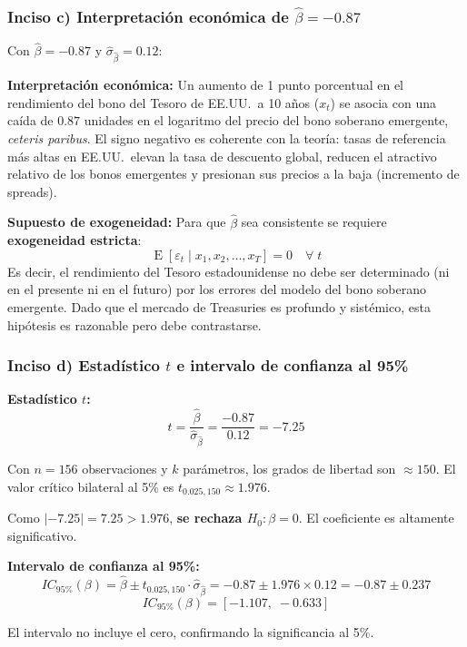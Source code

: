 \documentclass[12pt,a4paper]{article}
\DeclareMathOperator{\E}{E}
\begin{document}
\subsubsection*{Inciso c) Interpretación económica de $\hat{\beta}=-0.87$}

\begin{solucion}
Con $\hat{\beta}=-0.87$ y $\hat{\sigma}_{\hat{\beta}}=0.12$:

\textbf{Interpretación económica:} Un aumento de 1 punto porcentual en el rendimiento del bono del Tesoro de EE.UU.\ a 10 años ($x_t$) se asocia con una caída de $0.87$ unidades en el logaritmo del precio del bono soberano emergente, \emph{ceteris paribus}. El signo negativo es coherente con la teoría: tasas de referencia más altas en EE.UU.\ elevan la tasa de descuento global, reducen el atractivo relativo de los bonos emergentes y presionan sus precios a la baja (incremento de spreads).

\textbf{Supuesto de exogeneidad:} Para que $\hat{\beta}$ sea consistente se requiere \textbf{exogeneidad estricta}:
\begin{equation}
\E[\varepsilon_t \mid x_1, x_2, \ldots, x_T] = 0 \quad \forall\; t
\end{equation}
Es decir, el rendimiento del Tesoro estadounidense no debe ser determinado (ni en el presente ni en el futuro) por los errores del modelo del bono soberano emergente. Dado que el mercado de Treasuries es profundo y sistémico, esta hipótesis es razonable pero debe contrastarse.
\end{solucion}

\subsubsection*{Inciso d) Estadístico $t$ e intervalo de confianza al 95\%}

\begin{solucion}
\textbf{Estadístico $t$:}
\begin{equation}
t = \frac{\hat{\beta}}{\hat{\sigma}_{\hat{\beta}}} = \frac{-0.87}{0.12} = -7.25
\end{equation}

Con $n=156$ observaciones y $k$ parámetros, los grados de libertad son $\approx 150$. El valor crítico bilateral al 5\% es $t_{0.025,150}\approx 1.976$.

Como $|{-7.25}| = 7.25 > 1.976$, \textbf{se rechaza $H_0:\beta=0$}. El coeficiente es altamente significativo.

\textbf{Intervalo de confianza al 95\%:}
\begin{equation}
IC_{95\%}(\beta) = \hat{\beta} \pm t_{0.025,150}\cdot\hat{\sigma}_{\hat{\beta}} = -0.87 \pm 1.976\times 0.12
= -0.87 \pm 0.237
\end{equation}
\begin{equation}
\boxed{IC_{95\%}(\beta) = [-1.107,\;-0.633]}
\end{equation}

El intervalo no incluye el cero, confirmando la significancia al 5\%.
\end{solucion}
\end{document}
